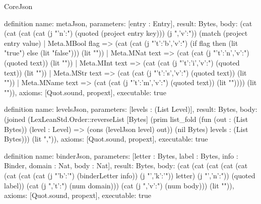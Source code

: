 \begin{lexlean}{CoreJson}
\begin{semanticmodule}
definition{
  name: metaJson,
  parameters: [entry : Entry],
  result: Bytes,
  body: (cat (cat (cat (cat (j "{'n':") (quoted (project entry key))) (j ",'v':")) (match (project entry value)
    | Meta.MBool flag => (cat (cat (j "{'t':'b','v':") (if flag then (lit "true") else (lit "false"))) (lit "}"))
    | Meta.MNat text => (cat (cat (j "{'t':'n','v':") (quoted text)) (lit "}"))
    | Meta.MInt text => (cat (cat (j "{'t':'i','v':") (quoted text)) (lit "}"))
    | Meta.MStr text => (cat (cat (j "{'t':'s','v':") (quoted text)) (lit "}"))
    | Meta.MName text => (cat (cat (j "{'t':'m','v':") (quoted text)) (lit "}")))) (lit "}")),
  axioms: [Quot.sound, propext],
  executable: true
}

definition{
  name: levelsJson,
  parameters: [levels : (List Level)],
  result: Bytes,
  body: (joined (LexLeanStd.Order::reverseList [Bytes] (prim list_fold (fun (out : (List Bytes)) (level : Level) => (cons (levelJson level) out)) (nil Bytes) levels : (List Bytes))) (lit ",")),
  axioms: [Quot.sound, propext],
  executable: true
}

definition{
  name: binderJson,
  parameters: [letter : Bytes, label : Bytes, info : Binder, domain : Nat, body : Nat],
  result: Bytes,
  body: (cat (cat (cat (cat (cat (cat (cat (cat (j "{'b':'") (binderLetter info)) (j "','k':'")) letter) (j "','n':")) (quoted label)) (cat (j ",'t':") (num domain))) (cat (j ",'v':") (num body))) (lit "}")),
  axioms: [Quot.sound, propext],
  executable: true
}


\end{semanticmodule}
\end{lexlean}

